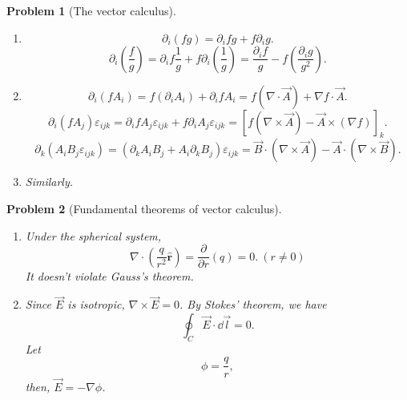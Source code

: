 \documentclass{article}
\theoremstyle{1}
\newtheorem{problem}{Problem}
\newcommand{\pa}{\partial}
\begin{document}
\begin{problem}[The vector calculus]
    \quad
    \begin{enumerate}
        \item \begin{equation}
            \pa_i(fg) = \pa_i f g + f\pa_i g.
        \end{equation}
        \begin{equation}
            \pa_i\left(\frac{f}{g}\right) = \pa_i f \frac{1}{g} + f \pa_i \left(\frac{1}{g}\right) = \frac{\pa_i f}{g} - f\left( \frac{\pa_i g}{g^2}\right).
        \end{equation}
        \item \begin{equation}
            \pa_i \left(f A_i\right) =  f\left(\pa_i A_i\right)  + \pa_i f A_i = f \left(\nabla \cdot \vec{A}\right) + \nabla f \cdot\vec{A}.
        \end{equation}
        \begin{equation}
            \pa_i \left(f A_j\right) \varepsilon_{ijk} = \pa_i f A_j \varepsilon_{ijk} + f \pa_i A_j \varepsilon_{ijk}= \left[f\left(\nabla \times \vec{A}\right)  - \vec{A} \times\left(\nabla f\right)\right]_{k}.
        \end{equation}
        \begin{equation}
            \pa_k \left(A_i B_j \varepsilon_{ijk}\right) = \left(\pa_k A_i B_j +A_i \pa_k B_j\right) \varepsilon_{ijk} = \vec{B} \cdot\left(\nabla \times \vec{A}\right) - \vec{A} \cdot\left( \nabla \times \vec{B}\right).
        \end{equation}
        \item Similarly.
    \end{enumerate}
\end{problem}
\begin{problem}[Fundamental theorems of vector calculus]
    \begin{enumerate}
        \item Under the spherical system,
        \begin{equation}
            \nabla \cdot\left(\frac{q}{r^2}\hat{\mathbf{r}}\right) = \frac{\pa}{\pa r}\left(q\right) = 0.\ (r\neq 0)
        \end{equation}
        It doesn't violate Gauss's theorem.
        \item Since $\vec{E}$ is isotropic, $\nabla \times \vec{E}=0$. By Stokes' theorem, we have
        \begin{equation}
            \oint_C \vec{E}\cdot\dd{\vec{l}} = 0.
        \end{equation}
        Let
        \begin{equation}
            \phi = \frac{q}{r},
        \end{equation}
        then, $\vec{E} = -\nabla \phi$.
    \end{enumerate}
\end{problem}
\end{document}
